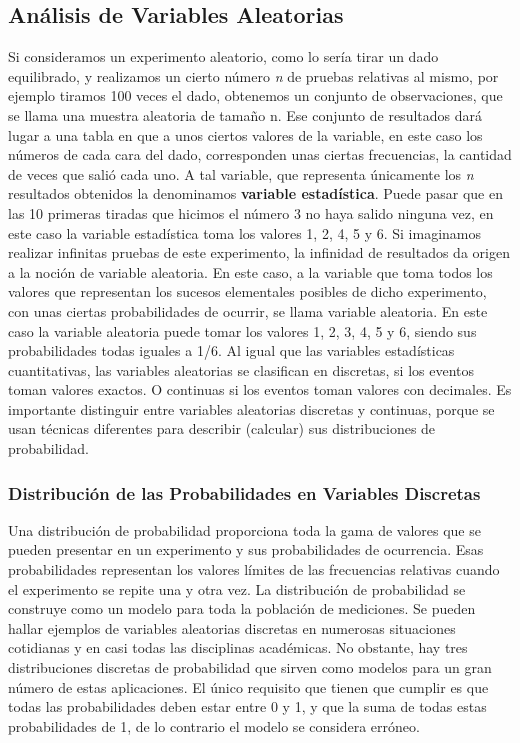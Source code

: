 \documentclass[]{article}
\begin{document}
\subsection{Análisis de Variables Aleatorias}
Si consideramos un experimento aleatorio, como lo sería tirar un dado equilibrado, y realizamos un cierto número \textit{n} de pruebas relativas al mismo, por ejemplo tiramos 100 veces el dado, obtenemos un conjunto de observaciones, que se llama una muestra aleatoria de tamaño n.
Ese conjunto de resultados dará lugar a una tabla en que a unos ciertos valores de la variable, en este caso los números de cada cara del dado, corresponden unas ciertas frecuencias, la cantidad de veces que salió cada uno. A tal variable, que representa únicamente los \textit{n} resultados obtenidos la denominamos \textbf{variable estadística}. Puede pasar que en las 10 primeras tiradas que hicimos el número 3 no haya salido ninguna vez, en este caso la variable estadística toma los valores 1, 2, 4, 5 y 6.
Si imaginamos realizar infinitas pruebas de este experimento, la infinidad de resultados da origen a la noción de variable aleatoria. En este caso, a la variable que toma todos los valores que representan los sucesos elementales posibles de dicho experimento, con unas ciertas probabilidades de ocurrir, se llama variable aleatoria. En este caso la variable aleatoria puede tomar los valores 1, 2, 3, 4, 5 y 6, siendo sus probabilidades todas iguales a 1/6.
Al igual que las variables estadísticas cuantitativas, las variables aleatorias se clasifican en discretas, si los eventos toman valores exactos. O continuas si los eventos toman valores con decimales. Es importante distinguir entre variables aleatorias discretas y continuas, porque se usan técnicas diferentes para describir  (calcular) sus distribuciones de probabilidad.
\subsubsection*{Distribución de las Probabilidades en Variables Discretas}
Una distribución de probabilidad proporciona toda la gama de valores que se pueden presentar en un experimento y sus probabilidades de ocurrencia. Esas probabilidades representan los valores límites de las frecuencias relativas cuando el experimento se repite una y otra vez. La distribución de probabilidad se construye como un modelo para toda la población de mediciones.
Se pueden hallar ejemplos de variables aleatorias discretas en numerosas situaciones cotidianas y en casi todas las disciplinas académicas. No obstante, hay tres distribuciones discretas de probabilidad que sirven como modelos para un gran número de estas aplicaciones. El único requisito que tienen que cumplir es que todas las probabilidades deben estar entre 0 y 1, y que la suma de todas estas probabilidades de 1, de lo contrario el modelo se considera erróneo.
\end{document}

